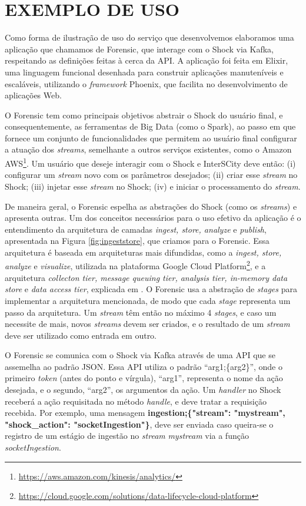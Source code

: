 \chapter[EXEMPLO DE USO]{EXEMPLO DE USO}
\label{chapter:example}

Como forma de ilustração de uso do serviço que desenvolvemos elaboramos uma
aplicação que chamamos de Forensic, que interage com o Shock via Kafka,
respeitando as definições feitas à cerca da API. A aplicação foi feita em
Elixir, uma linguagem funcional desenhada para construir aplicações
manuteníveis e escaláveis, utilizando o \textit{framework} Phoenix, que
facilita no desenvolvimento de aplicações Web.

O Forensic tem como principais objetivos abstrair o Shock do usuário final,
e consequentemente, as ferramentas de Big Data (como o Spark), ao passo em que
fornece um conjunto de funcionalidades que permitem ao usuário final configurar
a atuação dos \textit{streams}, semelhante a outros serviços existentes,
como o Amazon AWS\footnote{\url{https://aws.amazon.com/kinesis/analytics/}}.
Um usuário que deseje interagir com o Shock e InterSCity deve então:
(i) configurar um \textit{stream} novo com os
parâmetros desejados; (ii) criar esse \textit{stream} no Shock; (iii) injetar
esse \textit{stream} no Shock; (iv) e iniciar o processamento do
\textit{stream}.

De maneira geral, o Forensic espelha as abstrações do Shock (como os
\textit{streams}) e apresenta outras. Um dos conceitos necessários para o
uso efetivo da aplicação é o entendimento da arquitetura de camadas
\textit{ingest, store, analyze} e \textit{publish}, apresentada na Figura
\ref{fig:ingeststore}, que criamos para o Forensic. Essa arquitetura é baseada
em arquiteturas mais difundidas, como a \textit{ingest, store, analyze} e
\textit{visualize}, utilizada na plataforma Google Cloud
Platform\footnote{\url{https://cloud.google.com/solutions/data-lifecycle-cloud-platform}},
e a arquitetura \textit{collecton tier, message queuing tier, analysis tier,
in-memory data store} e \textit{data access tier}, explicada em
. O Forensic usa a abstração de \textit{stages}
para implementar a arquitetura mencionada, de modo que cada \textit{stage}
representa um passo da arquitetura. Um \textit{stream} têm então no máximo
4 \textit{stages}, e caso um necessite de mais, novos \textit{streams} devem
ser criados, e o resultado de um \textit{stream} deve ser utilizado como entrada
em outro.

O Forensic se comunica com o Shock via Kafka através de uma API que se assemelha
ao padrão JSON. Essa API utiliza o padrão ``arg1;\{arg2\}'',
onde o primeiro \textit{token} (antes do ponto e vírgula), ``arg1'', representa o nome
da ação desejada, e o segundo, ``arg2'', os argumentos da ação. Um
\textit{handler} no Shock receberá a ação requisitada no método
\textit{handle}, e deve tratar a requisição recebida. Por exemplo, uma mensagem
\textbf{ingestion;\{"stream": "mystream", "shock\_action": "socketIngestion"\}},
deve ser enviada caso queira-se o registro de um estágio de ingestão no
\textit{stream} \textit{mystream} via a função \textit{socketIngestion}.


